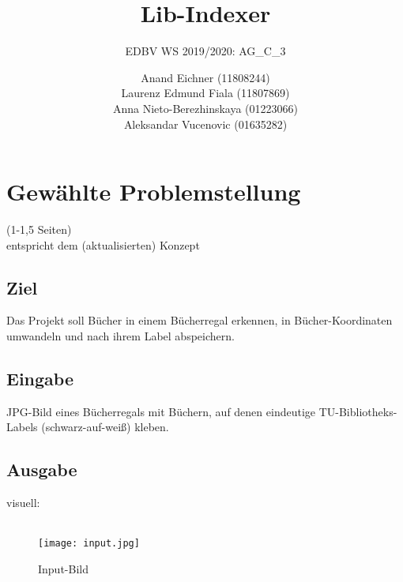 \documentclass[paper=A4, deutsch]{scrartcl}
\begin{document}

\title{Lib-Indexer} %

\subtitle{EDBV WS 2019/2020: AG\_C\_3} %


\author{Anand Eichner (11808244)\\
Laurenz Edmund Fiala (11807869)\\
Anna Nieto-Berezhinskaya (01223066)\\
Aleksandar Vucenovic (01635282)}




\maketitle


\section{Gewählte Problemstellung}
(1-1,5 Seiten)\\
entspricht dem (aktualisierten) Konzept
\subsection{Ziel}
Das Projekt soll Bücher in einem Bücherregal erkennen, in Bücher-Koordinaten umwandeln und nach ihrem Label abspeichern.

\subsection{Eingabe}
JPG-Bild eines Bücherregals mit Büchern, auf denen eindeutige TU-Bibliotheks-Labels (schwarz-auf-weiß) kleben.

\subsection{Ausgabe}
visuell:\\
\\
\begin{figure}[H]
 \centering
 \texttt{[image: input.jpg]}
 \caption{Input-Bild}
 \label{fig:img}
\end{figure}
\end{document}
